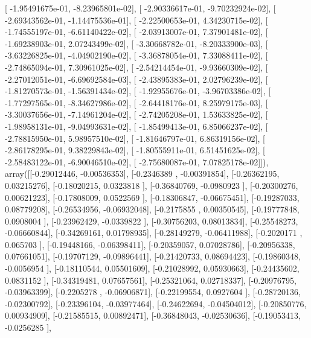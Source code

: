 \documentclass{article}
\begin{document}
       [ -1.95491675e-01,  -8.23965801e-02],
       [ -2.90336617e-01,  -9.70232924e-02],
       [ -2.69343562e-01,  -1.14475536e-01],
       [ -2.22500653e-01,   4.34230715e-02],
       [ -1.74555197e-01,  -6.61140422e-02],
       [ -2.03913007e-01,   7.37901481e-02],
       [ -1.69238903e-01,   2.07243499e-02],
       [ -3.30668782e-01,  -8.20333900e-03],
       [ -3.63226825e-01,  -4.04902190e-02],
       [ -3.36878054e-01,   7.33088411e-02],
       [ -2.74865094e-01,   7.30961025e-02],
       [ -2.54214454e-01,  -9.93660309e-02],
       [ -2.27012051e-01,  -6.69692584e-03],
       [ -2.43895383e-01,   2.02796239e-02],
       [ -1.81270573e-01,  -1.56391434e-02],
       [ -1.92955676e-01,  -3.96703386e-02],
       [ -1.77297565e-01,  -8.34627986e-02],
       [ -2.64418176e-01,   8.25979175e-03],
       [ -3.30037656e-01,  -7.14961204e-02],
       [ -2.74205208e-01,   1.53633825e-02],
       [ -1.98958131e-01,  -9.04993631e-02],
       [ -1.85499413e-01,   6.85066237e-02],
       [ -2.78815950e-01,   5.98957510e-02],
       [ -1.81646797e-01,   6.86319156e-02],
       [ -2.86178295e-01,   9.38229843e-02],
       [ -1.80555911e-01,   6.51451625e-02],
       [ -2.58483122e-01,  -6.90046510e-02],
       [ -2.75680087e-01,   7.07825178e-02]]), array([[-0.29012446, -0.00536353],
       [-0.2346389 , -0.00391854],
       [-0.26362195,  0.03215276],
       [-0.18020215,  0.0323818 ],
       [-0.36840769, -0.0980923 ],
       [-0.20300276,  0.00621223],
       [-0.17808009,  0.0522569 ],
       [-0.18306847, -0.06675451],
       [-0.19287033,  0.08779208],
       [-0.26534956, -0.06932048],
       [-0.2175855 ,  0.00350545],
       [-0.19777848,  0.0908004 ],
       [-0.23962429, -0.0339822 ],
       [-0.30756203,  0.08013834],
       [-0.25548273, -0.06660844],
       [-0.34269161,  0.01798935],
       [-0.28149279, -0.06411988],
       [-0.2020171 ,  0.065703  ],
       [-0.19448166, -0.06398411],
       [-0.20359057,  0.07028786],
       [-0.20956338,  0.07661051],
       [-0.19707129, -0.09896441],
       [-0.21420733,  0.08694423],
       [-0.19860348, -0.0056954 ],
       [-0.18110544,  0.05501609],
       [-0.21028992,  0.05930663],
       [-0.24435602,  0.0831152 ],
       [-0.34319481,  0.07657561],
       [-0.25321064,  0.02718337],
       [-0.20976795, -0.03963399],
       [-0.2205278 , -0.06906871],
       [-0.22199554,  0.0927604 ],
       [-0.28720136, -0.02300792],
       [-0.23396104, -0.03977464],
       [-0.24622694, -0.04504012],
       [-0.20850776,  0.00934909],
       [-0.21585515,  0.00892471],
       [-0.36848043, -0.02530636],
       [-0.19053413, -0.0256285 ],
\end{document}
